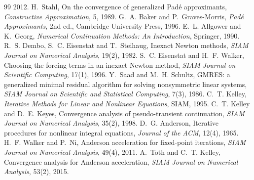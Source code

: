 {\begin{thebibliography}{99}
2012.
 H.~Stahl, On the convergence of generalized Pad\'e
approximants, \emph{Constructive Approximation}, 5, 1989.
 G.~A. Baker and P.~Graves-Morris, \emph{Pad\'e
Approximants}, 2nd ed., Cambridge University Press, 1996.
 E.~L. Allgower and K.~Georg, \emph{Numerical
Continuation Methods: An Introduction}, Springer, 1990.
 R.~S. Dembo, S.~C. Eisenstat and T.~Steihaug, Inexact
Newton methods, \emph{SIAM Journal on Numerical Analysis}, 19(2), 1982.
 S.~C. Eisenstat and H.~F. Walker, Choosing the forcing
terms in an inexact Newton method, \emph{SIAM Journal on Scientific
Computing}, 17(1), 1996.
 Y.~Saad and M.~H. Schultz, GMRES: a
generalized minimal residual algorithm for solving nonsymmetric linear
systems, \emph{SIAM Journal on Scientific and Statistical Computing},
7(3), 1986.
 C.~T. Kelley, \emph{Iterative Methods for Linear
and Nonlinear Equations}, SIAM, 1995.
 C.~T. Kelley and D.~E. Keyes, Convergence
analysis of pseudo-transient continuation, \emph{SIAM Journal on Numerical
Analysis}, 35(2), 1998.
 D.~G. Anderson, Iterative procedures for nonlinear
integral equations, \emph{Journal of the ACM}, 12(4), 1965.
 H.~F. Walker and P.~Ni, Anderson acceleration for
fixed-point iterations, \emph{SIAM Journal on Numerical Analysis}, 49(4), 2011.
 A.~Toth and C.~T. Kelley, Convergence analysis for
Anderson acceleration, \emph{SIAM Journal on Numerical Analysis}, 53(2), 2015.
\end{thebibliography}}
